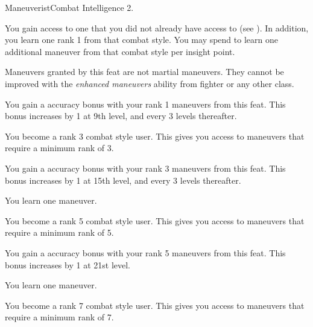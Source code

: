  \begin{feat}{Maneuverist}{Combat}
    \featpre Intelligence 2.

     You gain access to one  that you did not already have access to (see ).
    In addition, you learn one rank 1  from that combat style.
    You may spend  to learn one additional maneuver from that combat style per insight point.

    Maneuvers granted by this feat are not martial maneuvers.
    They cannot be improved with the \textit{enhanced maneuvers} ability from fighter or any other class.

     You gain a  accuracy bonus with your rank 1 maneuvers from this feat.
    This bonus increases by 1 at 9th level, and every 3 levels thereafter.

     You become a rank 3 combat style user.
    This gives you access to maneuvers that require a minimum rank of 3.

     You gain a  accuracy bonus with your rank 3 maneuvers from this feat.
    This bonus increases by 1 at 15th level, and every 3 levels thereafter.

     You learn one maneuver.

     You become a rank 5 combat style user.
    This gives you access to maneuvers that require a minimum rank of 5.

     You gain a  accuracy bonus with your rank 5 maneuvers from this feat.
    This bonus increases by 1 at 21st level.

     You learn one maneuver.

     You become a rank 7 combat style user.
    This gives you access to maneuvers that require a minimum rank of 7.
  \end{feat}

